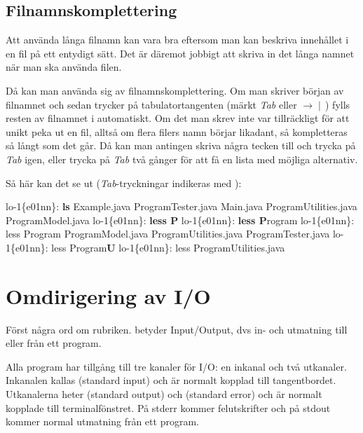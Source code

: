 \documentclass[a4paper,twocolumn]{book}
\begin{document}
\subsection{Filnamnskomplettering}

Att använda långa filnamn kan vara bra eftersom
man kan beskriva innehållet i en fil på ett entydigt sätt. Det är
däremot jobbigt att skriva in det långa namnet när man ska använda
filen.

Då kan man använda sig av filnamnskomplettering. Om man skriver början
av filnamnet och sedan trycker på tabulatortangenten (märkt \emph{Tab}
eller $\rightarrow\!\mid\,$) fylls resten av filnamnet i automatiskt. Om
det man skrev inte var tillräckligt för att unikt peka ut en fil, alltså
om flera filers namn börjar likadant, så kompletteras så långt som det går.
Då kan man antingen skriva några tecken till och trycka på \emph{Tab} igen,
eller trycka på \emph{Tab} två gånger för att få en lista med möjliga alternativ.

Så här kan det se ut (\emph{Tab}-tryckningar indikeras med \Tab):
\begin{example}
  lo-1\{e01nn\}: \textbf{ls}
  Example.java       ProgramTester.java
  Main.java          ProgramUtilities.java
  ProgramModel.java
  lo-1\{e01nn\}: \textbf{less P \Tab}
  lo-1\{e01nn\}: \textbf{less P}rogram
  lo-1\{e01nn\}: less Program \textbf{\Tab \Tab}
  ProgramModel.java   ProgramUtilities.java
  ProgramTester.java
  lo-1\{e01nn\}: less Program\textbf{U \Tab}
  lo-1\{e01nn\}: less ProgramUtilities.java
\end{example}

\section{Omdirigering av I/O}

Först några ord om rubriken.  betyder Input/Output, dvs in-
och utmatning till eller från ett program.

Alla program har tillgång till tre kanaler för I/O: en inkanal och två
utkanaler. Inkanalen kallas  (standard input) och är
normalt kopplad till tangentbordet. Utkanalerna heter 
(standard output) och  (standard error) och är normalt
kopplade till terminalfönstret. På stderr kommer felutskrifter och på
stdout kommer normal utmatning från ett program.
\end{document}
